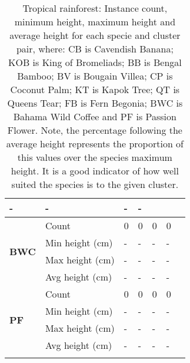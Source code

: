 \begin{longtable}{|p{2cm}|p{2cm}|p{2cm}|p{2cm}|p{2cm}|p{2cm}|p{2cm}|}
						\multicolumn{1}{l|}{-} & 
						\multicolumn{1}{l|}{-} &
						\multicolumn{1}{l|}{-} & 
						\multicolumn{1}{l|}{-} \\\cline{2-7}
		\hline    
		\multirow{4}{*}{\textbf{BWC}} & 
						\multicolumn{1}{l|}{Count} & 
						\multicolumn{1}{l|}{0} & 
						\multicolumn{1}{l|}{0} &
						\multicolumn{1}{l|}{0} & 
						\multicolumn{1}{l|}{0} \\\cline{2-7} &
						\multicolumn{1}{l|}{Min height (cm)} & 
						\multicolumn{1}{l|}{-} & 
						\multicolumn{1}{l|}{-} &
						\multicolumn{1}{l|}{-} & 
						\multicolumn{1}{l|}{-} \\\cline{2-7} &
						\multicolumn{1}{l|}{Max height (cm)} & 
						\multicolumn{1}{l|}{-} & 
						\multicolumn{1}{l|}{-} &
						\multicolumn{1}{l|}{-} & 
						\multicolumn{1}{l|}{-} \\\cline{2-7} &
						\multicolumn{1}{l|}{Avg height (cm)} & 
						\multicolumn{1}{l|}{-} & 
						\multicolumn{1}{l|}{-} &
						\multicolumn{1}{l|}{-} & 
						\multicolumn{1}{l|}{-} \\\cline{2-7}
		\hline    
		\multirow{4}{*}{\textbf{PF}} & 
						\multicolumn{1}{l|}{Count} & 
						\multicolumn{1}{l|}{0} & 
						\multicolumn{1}{l|}{0} &
						\multicolumn{1}{l|}{0} & 
						\multicolumn{1}{l|}{0} \\\cline{2-7} &
						\multicolumn{1}{l|}{Min height (cm)} & 
						\multicolumn{1}{l|}{-} & 
						\multicolumn{1}{l|}{-} &
						\multicolumn{1}{l|}{-} & 
						\multicolumn{1}{l|}{-} \\\cline{2-7} &
						\multicolumn{1}{l|}{Max height (cm)} & 
						\multicolumn{1}{l|}{-} & 
						\multicolumn{1}{l|}{-} &
						\multicolumn{1}{l|}{-} & 
						\multicolumn{1}{l|}{-} \\\cline{2-7} &
						\multicolumn{1}{l|}{Avg height (cm)} & 
						\multicolumn{1}{l|}{-} & 
						\multicolumn{1}{l|}{-} &
						\multicolumn{1}{l|}{-} & 
						\multicolumn{1}{l|}{-} \\\cline{2-7}
		\hline                                                
	\caption{Tropical rainforest: Instance count, minimum height, maximum height and average height for each specie and cluster pair, where: CB is Cavendish Banana; KOB is King of Bromeliads; BB is Bengal Bamboo; BV is Bougain Villea; CP is Coconut Palm; KT is Kapok Tree; QT is Queens Tear; FB is Fern Begonia; BWC is Bahama Wild Coffee and PF is Passion Flower. Note, the percentage following the average height represents the proportion of this values over the species maximum height. It is a good indicator of how well suited the species is to the given cluster.}
	\label{tab:results_tropical_big_species_cluster_properties}	
\end{longtable}


